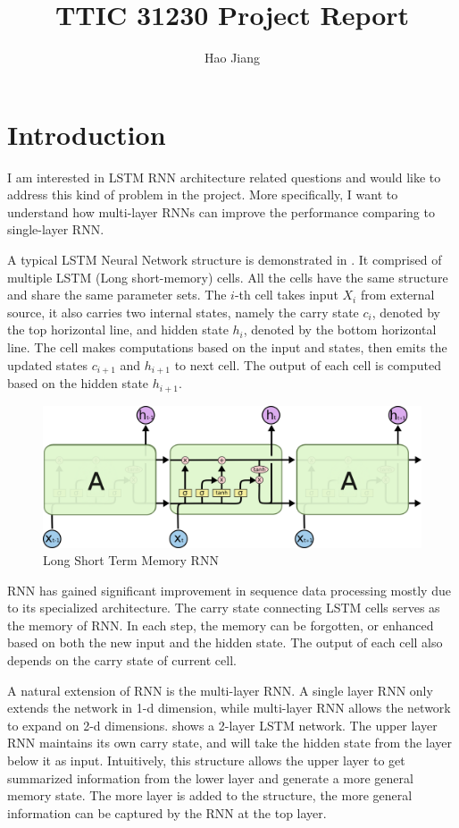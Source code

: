 \documentclass{article}
\title{TTIC 31230 Project Report}
\author{Hao Jiang}
\begin{document}
\maketitle

\section{Introduction}
I am interested in LSTM RNN architecture related questions and would 
like to address this kind of problem in the project. More specifically,
I want to understand how multi-layer RNNs can improve the performance
comparing to single-layer RNN.

A typical LSTM Neural Network structure is demonstrated in . It
comprised of multiple LSTM (Long short-memory) cells. All the cells have the same 
structure and share the same parameter sets. The $i$-th cell takes input 
$X_i$ from external source, it also carries two internal states, namely 
the carry state $c_i$, denoted by the top horizontal line, and hidden state
$h_i$, denoted by the bottom horizontal line. The cell makes computations 
based on the input and states, then emits the updated states $c_{i+1}$ and 
$h_{i+1}$ to next cell. The output of each cell is computed based on the 
hidden state $h_{i+1}$. 
 
\begin{figure}
\centering
\includegraphics[scale=0.7]{lstm.png} 
\caption{Long Short Term Memory RNN}
\label{fig:lstm}
\end{figure} 

RNN has gained significant improvement in sequence data processing mostly
due to its specialized architecture. The carry state connecting LSTM cells
serves as the memory of RNN. In each step, the memory can be forgotten, or enhanced
based on both the new input and the hidden state. The output of each cell also
depends on the carry state of current cell.

A natural extension of RNN is the multi-layer RNN. A single layer RNN only
extends the network in 1-d dimension, while multi-layer RNN allows the network
to expand on 2-d dimensions.  shows a 2-layer LSTM network. The
upper layer RNN maintains its own carry state, and will take the hidden state
from the layer below it as input. Intuitively, this structure allows the upper
layer to get summarized information from the lower layer and generate a more 
general memory state. The more layer is added to the structure, the more
general information can be captured by the RNN at the top layer.
\end{document}
